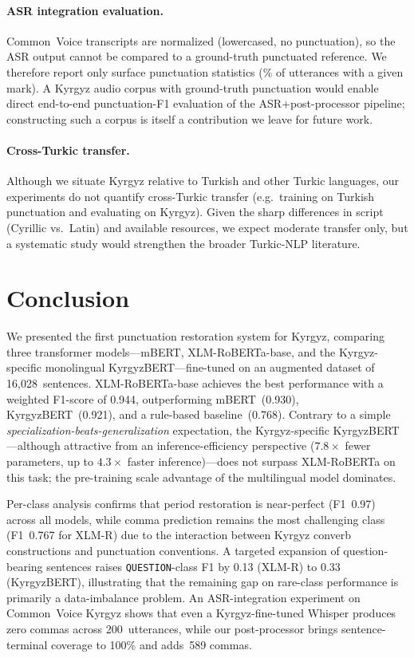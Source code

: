 \documentclass[manuscript, review]{acmart}
\begin{document}
\paragraph{ASR integration evaluation.} Common~Voice transcripts are normalized (lowercased, no punctuation), so the ASR output cannot be compared to a ground-truth punctuated reference. We therefore report only surface punctuation statistics (\% of utterances with a given mark). A Kyrgyz audio corpus with ground-truth punctuation would enable direct end-to-end punctuation-F1 evaluation of the ASR+post-processor pipeline; constructing such a corpus is itself a contribution we leave for future work.

\paragraph{Cross-Turkic transfer.} Although we situate Kyrgyz relative to Turkish and other Turkic languages, our experiments do not quantify cross-Turkic transfer (e.g.\ training on Turkish punctuation and evaluating on Kyrgyz). Given the sharp differences in script (Cyrillic vs.\ Latin) and available resources, we expect moderate transfer only, but a systematic study would strengthen the broader Turkic-NLP literature.

\section{Conclusion}
\label{sec:conclusion}

We presented the first punctuation restoration system for Kyrgyz, comparing three transformer models---mBERT, XLM-RoBERTa-base, and the Kyrgyz-specific monolingual KyrgyzBERT---fine-tuned on an augmented dataset of 16{,}028~sentences. XLM-RoBERTa-base achieves the best performance with a weighted F1-score of 0.944, outperforming mBERT~(0.930), KyrgyzBERT~(0.921), and a rule-based baseline~(0.768). Contrary to a simple \emph{specialization-beats-generalization} expectation, the Kyrgyz-specific KyrgyzBERT---although attractive from an inference-efficiency perspective ($7.8\times$ fewer parameters, up to $4.3\times$ faster inference)---does not surpass XLM-RoBERTa on this task; the pre-training scale advantage of the multilingual model dominates.

Per-class analysis confirms that period restoration is near-perfect (F1~0.97) across all models, while comma prediction remains the most challenging class (F1~0.767 for XLM-R) due to the interaction between Kyrgyz converb constructions and punctuation conventions. A targeted expansion of question-bearing sentences raises \texttt{QUESTION}-class F1 by 0.13 (XLM-R) to 0.33 (KyrgyzBERT), illustrating that the remaining gap on rare-class performance is primarily a data-imbalance problem. An ASR-integration experiment on Common~Voice Kyrgyz shows that even a Kyrgyz-fine-tuned Whisper produces zero commas across 200~utterances, while our post-processor brings sentence-terminal coverage to 100\% and adds~589 commas.
\end{document}

